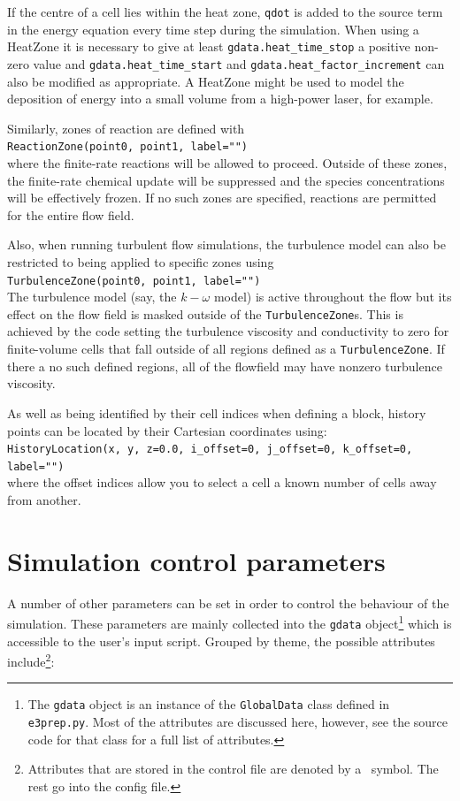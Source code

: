 \medskip
If the centre of a cell lies within the heat zone, \verb!qdot! is added to
the source term in the energy equation every time step during the simulation. When using
a HeatZone it is necessary to give at least \verb!gdata.heat_time_stop! a positive non-zero
value and \verb!gdata.heat_time_start! and \verb!gdata.heat_factor_increment! can also be modified
as appropriate.
A HeatZone might be used to model the deposition of energy into a small volume from 
a high-power laser, for example.

\medskip
Similarly, zones of reaction are defined with\\
\texttt{ReactionZone(point0, point1, label="")}\\
where the finite-rate reactions will be allowed to proceed.
Outside of these zones, the finite-rate chemical update will be suppressed 
and the species concentrations will be effectively frozen.
If no such zones are specified, reactions are permitted for the entire flow field.

\medskip
Also, when running turbulent flow simulations, the turbulence model can also be
restricted to being applied to specific zones using\\
\texttt{TurbulenceZone(point0, point1, label="")}\\
The turbulence model (say, the $k-\omega$ model) is active throughout the flow
but its effect on the flow field is masked outside of the \texttt{TurbulenceZone}s.
This is achieved by the code setting the turbulence viscosity and conductivity to zero
for finite-volume cells that fall outside of all regions defined as a \texttt{TurbulenceZone}.
If there a no such defined regions, all of the flowfield may have nonzero turbulence viscosity.

\medskip
As well as being identified by their cell indices when defining a block,
history points can be located by their Cartesian coordinates using:\\
\texttt{HistoryLocation(x, y, z=0.0, i\_offset=0, j\_offset=0, k\_offset=0, label="")} \\
where the offset indices allow you to select a cell a known number of cells 
away from another.

\bigskip
\section{Simulation control parameters}
\label{sec:sim-control-parameters}
%
A number of other parameters can be set in order to control the behaviour of
the simulation.
These parameters are mainly collected into the \texttt{gdata}
object\footnote{The \texttt{gdata} object is an instance of the \texttt{GlobalData}
  class defined in \texttt{e3prep.py}. Most of the attributes are discussed here,
  however, see the source code for that class for a full list of attributes.} 
which is accessible to the user's input script.
Grouped by theme, the possible attributes include\footnote{Attributes that are stored in the control file
are denoted by a \ddag ~symbol.  The rest go into the config file.}:

